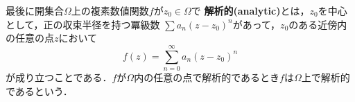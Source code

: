 




\Proposition{

}{}

最後に開集合$\Omega$上の複素数値関数$f$が$z_{0}\in \Omega$で
\textbf{解析的(analytic)}とは，$z_{0}$を中心として，正の収束半径を持つ冪級数
$\sum a_{n}(z - z_{0})^{n}$があって，$z_{0}$のある近傍内の任意の点$z$において
\begin{equation}
  f(z) = \sum_{n = 0}^{\infty}a_{n}(z - z_{0})^{n}
\end{equation}
が成り立つことである．$f$が$\Omega$内の任意の点で解析的であるとき$f$は$\Omega$上で解析的であるという．

